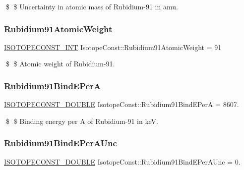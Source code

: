 \$ \$ Uncertainty in atomic mass of Rubidium-\/91 in amu. \mbox{\label{group___isotope_const-_rubidium-_rb91_ga941a4da54c3af3416feb33a73290f52e}} 
\subsubsection{\texorpdfstring{Rubidium91\+Atomic\+Weight}{Rubidium91AtomicWeight}}
{\footnotesize\ttfamily \mbox{\hyperlink{group___isotope_const-_macros_ga5f18360b3e99483a35c32d789e62621c}{I\+S\+O\+T\+O\+P\+E\+C\+O\+N\+S\+T\+\_\+\+I\+NT}} Isotope\+Const\+::\+Rubidium91\+Atomic\+Weight = 91}

\$ \$ Atomic weight of Rubidium-\/91. \mbox{\label{group___isotope_const-_rubidium-_rb91_ga87eec47a144f0e84e97e7e258b8e977e}} 
\subsubsection{\texorpdfstring{Rubidium91\+Bind\+E\+PerA}{Rubidium91BindEPerA}}
{\footnotesize\ttfamily \mbox{\hyperlink{group___isotope_const-_macros_ga8f45a7272ce02c0b4c65c44636ed719a}{I\+S\+O\+T\+O\+P\+E\+C\+O\+N\+S\+T\+\_\+\+D\+O\+U\+B\+LE}} Isotope\+Const\+::\+Rubidium91\+Bind\+E\+PerA = 8607.}

\$ \$ Binding energy per A of Rubidium-\/91 in keV. \mbox{\label{group___isotope_const-_rubidium-_rb91_gac2426b6dbbaf82f957d622e8d6d62196}} 
\subsubsection{\texorpdfstring{Rubidium91\+Bind\+E\+Per\+A\+Unc}{Rubidium91BindEPerAUnc}}
{\footnotesize\ttfamily \mbox{\hyperlink{group___isotope_const-_macros_ga8f45a7272ce02c0b4c65c44636ed719a}{I\+S\+O\+T\+O\+P\+E\+C\+O\+N\+S\+T\+\_\+\+D\+O\+U\+B\+LE}} Isotope\+Const\+::\+Rubidium91\+Bind\+E\+Per\+A\+Unc = 0.}

